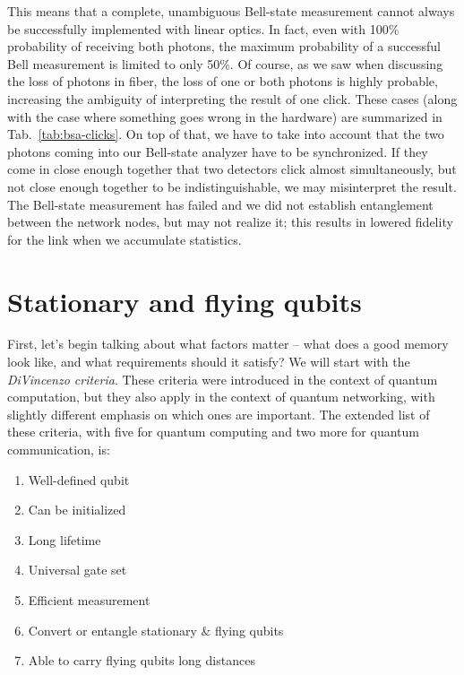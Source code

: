 This means that a complete, unambiguous Bell-state measurement cannot always be successfully implemented with linear optics. In fact, even with 100\% probability of receiving both photons, the maximum probability of a successful Bell measurement is limited to only 50\%.  Of course, as we saw when discussing the loss of photons in fiber, the loss of one or both photons is highly probable, increasing the ambiguity of interpreting the result of one click.  These cases (along with the case where something goes wrong in the hardware) are summarized in Tab.~\ref{tab:bsa-clicks}. 
On top of that, we have to take into account that the two photons coming into our Bell-state analyzer have to be synchronized. If they come in close enough together that two detectors click almost simultaneously, but not close enough together to be indistinguishable, we may misinterpret the result. The Bell-state measurement has failed and we did not establish entanglement between the network nodes, but may not realize it; this results in lowered fidelity for the link when we accumulate statistics.


\section{Stationary and flying qubits}

First, let's begin talking about what factors matter -- what does a good memory look like, and what requirements should it satisfy?  We will start with the \emph{DiVincenzo criteria}. These criteria were introduced in the context of quantum computation, but they also apply in the context of quantum networking, with slightly different emphasis on which ones are important.  The extended list of these criteria, with five for quantum computing and two more for quantum communication, is:

\begin{enumerate}
    \item Well-defined qubit
    \item Can be initialized
    \item Long lifetime
    \item Universal gate set
    \item Efficient measurement
    \item Convert or entangle stationary \& flying qubits
    \item Able to carry flying qubits long distances
\end{enumerate}

